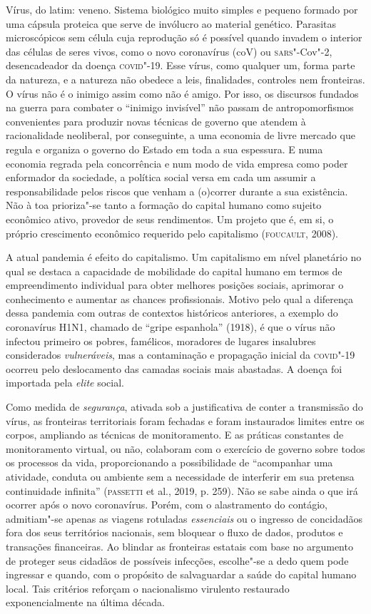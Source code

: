 \noindent{}Vírus, do latim: veneno. Sistema biológico muito simples e pequeno
formado por uma cápsula proteica que serve de invólucro ao material
genético. Parasitas microscópicos sem célula cuja reprodução só é
possível quando invadem o interior das células de seres vivos, como o
novo coronavírus (coV) ou \textsc{sars}"-Cov"-2, desencadeador da doença \textsc{covid}"-19.
Esse vírus, como qualquer um, forma parte da natureza, e a natureza não
obedece a leis, finalidades, controles nem fronteiras. O vírus não é o
inimigo assim como não é amigo. Por isso, os discursos fundados na
guerra para combater o ``inimigo invisível'' não passam de
antropomorfismos convenientes para produzir novas técnicas de governo
que atendem à racionalidade neoliberal,
por conseguinte, a uma economia de
livre mercado que regula e organiza o governo do Estado em toda a sua
espessura. E numa economia regrada pela concorrência e num modo de vida
empresa como poder enformador da sociedade, a política social versa em
cada um assumir a responsabilidade pelos riscos que venham a (o)correr
durante a sua existência. Não à toa prioriza"-se tanto a formação do
capital humano como sujeito econômico ativo, provedor de seus
rendimentos. Um projeto que é, em si, o próprio crescimento econômico
requerido pelo capitalismo (\textsc{foucault}, 2008).

A atual pandemia é efeito do capitalismo. Um capitalismo em nível
planetário no qual se destaca a capacidade de mobilidade do capital
humano em termos de empreendimento
individual para obter melhores
posições sociais, aprimorar o conhecimento e aumentar as chances
profissionais. Motivo pelo qual a diferença dessa pandemia com outras de
contextos históricos anteriores, a exemplo do coronavírus H1N1, chamado
de ``gripe espanhola'' (1918), é que o vírus não infectou primeiro os
pobres, famélicos, moradores de lugares insalubres considerados
\emph{vulneráveis}, mas a contaminação e propagação inicial da \textsc{covid}"-19
ocorreu pelo deslocamento das camadas sociais mais abastadas. A doença
foi importada pela \emph{elite} social.

Como medida de \emph{segurança}, ativada sob a justificativa de conter a
transmissão do vírus, as fronteiras territoriais foram fechadas e foram
instaurados limites entre os corpos, ampliando as técnicas de
monitoramento. E as práticas constantes de monitoramento virtual, ou
não, colaboram com o exercício de governo sobre todos os processos da
vida, proporcionando a possibilidade de ``acompanhar uma atividade,
conduta ou ambiente sem a necessidade de interferir em sua pretensa
continuidade infinita'' (\textsc{passetti} et al., 2019, p. 259). Não se sabe
ainda o que irá ocorrer após o novo coronavírus. Porém, com o
alastramento do contágio, admitiam"-se apenas as viagens rotuladas
\emph{essenciais} ou o ingresso de concidadãos fora dos seus territórios
nacionais, sem bloquear o fluxo de dados, produtos e transações
financeiras. Ao blindar as fronteiras estatais com base no argumento de
proteger seus cidadãos de possíveis infecções, escolhe"-se a dedo quem
pode ingressar e quando, com o propósito de salvaguardar a saúde do
capital humano local. Tais critérios reforçam o nacionalismo virulento
restaurado exponencialmente na última década.

